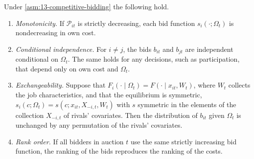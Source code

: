 \begin{proposition}\label{prop:13-competitive-restrictions}
Under \cref{asm:13-competitive-bidding} the following hold.
\begin{enumerate}[label=(\roman*)]
\item \emph{Monotonicity.} If $\mathcal{P}_{it}$ is strictly decreasing, each bid function $s_i(\cdot;\Omega_t)$ is
nondecreasing in own cost.
\item \emph{Conditional independence.} For $i \neq j$, the bids $b_{it}$ and $b_{jt}$ are independent conditional on
$\Omega_t$. The same holds for any decisions, such as participation, that depend only on own cost and $\Omega_t$.
\item \emph{Exchangeability.} Suppose that $F_i(\cdot\mid\Omega_t) = F(\cdot \mid x_{it}, W_t)$, where $W_t$ collects
the job characteristics, and that the equilibrium is symmetric, $s_i(c;\Omega_t) = s(c; x_{it}, X_{-i,t}, W_t)$
with $s$ symmetric in the elements of the collection $X_{-i,t}$ of rivals' covariates. Then the distribution of
$b_{it}$ given $\Omega_t$ is unchanged by any permutation of the rivals' covariates.
\item \emph{Rank order.} If all bidders in auction $t$ use the same strictly increasing bid function, the ranking of
the bids reproduces the ranking of the costs.
\end{enumerate}
\end{proposition}

